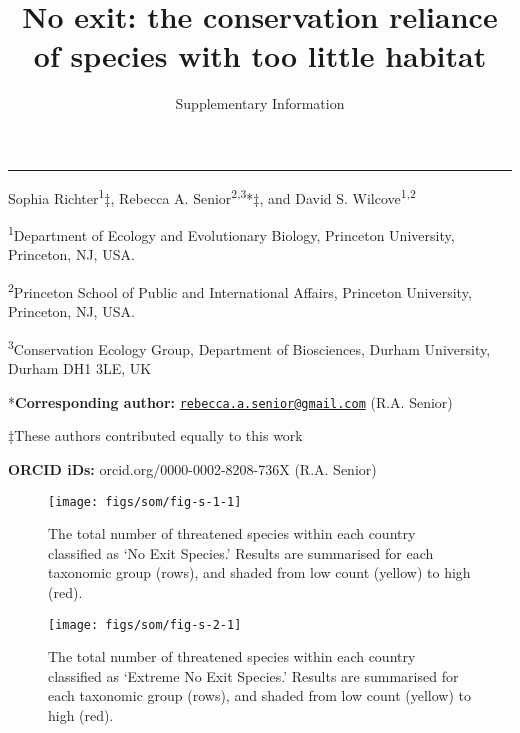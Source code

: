 \documentclass[
  12pt,
  a4paper,
]{article}
\title{No exit: the conservation reliance of species with too little habitat}
\subtitle{Supplementary Information}
\author{}
\date{\vspace{-2.5em}}
\newcommand{\beginsupplement}{\setcounter{table}{0}  \renewcommand{\tablename}{Supplementary Table} \setcounter{figure}{0} \renewcommand{\figurename}{Supplementary Figure}}
\begin{document}
\maketitle

\begin{center}\rule{0.5\linewidth}{0.5pt}\end{center}

Sophia Richter\textsuperscript{1}‡, Rebecca A. Senior\textsuperscript{2,3}*‡, and David S. Wilcove\textsuperscript{1,2}

\textsuperscript{1}Department of Ecology and Evolutionary Biology, Princeton University, Princeton, NJ, USA.

\textsuperscript{2}Princeton School of Public and International Affairs, Princeton University, Princeton, NJ, USA.

\textsuperscript{3}Conservation Ecology Group, Department of Biosciences, Durham University, Durham DH1 3LE, UK

*\textbf{Corresponding author:} \href{mailto:rebecca.a.senior@gmail.com}{\nolinkurl{rebecca.a.senior@gmail.com}} (R.A. Senior)

‡These authors contributed equally to this work

\textbf{ORCID iDs:} orcid.org/0000-0002-8208-736X (R.A. Senior)

\pagebreak
\raggedright
\beginsupplement

\pagebreak



\begin{figure}

{\centering \texttt{[image: figs/som/fig-s-1-1]} 

}

\caption{The total number of threatened species within each country classified as `No Exit Species.' Results are summarised for each taxonomic group (rows), and shaded from low count (yellow) to high (red).}\label{fig:fig-s-1}
\end{figure}

\pagebreak



\begin{figure}

{\centering \texttt{[image: figs/som/fig-s-2-1]} 

}

\caption{The total number of threatened species within each country classified as `Extreme No Exit Species.' Results are summarised for each taxonomic group (rows), and shaded from low count (yellow) to high (red).}\label{fig:fig-s-2}
\end{figure}
\end{document}
